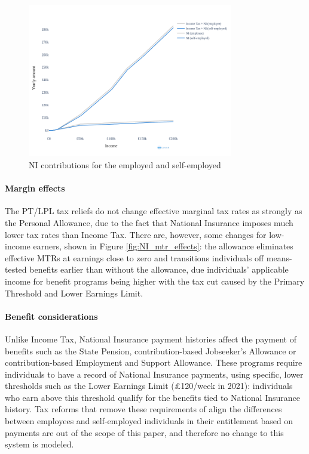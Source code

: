 \documentclass{article}
\begin{document}
    \begin{figure}
        \centering
        \includegraphics[width=0.8\textwidth]{images/fig_8.png}
        \caption{NI contributions for the employed and self-employed}
        \label{fig:NI_self_emp_diff}
    \end{figure}

    \paragraph{Margin effects} The PT/LPL tax reliefs do not change effective marginal tax rates as strongly as the Personal Allowance, due to the fact that National Insurance imposes much lower tax rates than Income Tax. There are, however, some changes for low-income earners, shown in Figure \ref{fig:NI_mtr_effects}: the allowance eliminates effective MTRs at earnings close to zero and transitions individuals off means-tested benefits earlier than without the allowance, due individuals' applicable income for benefit programs being higher with the tax cut caused by the Primary Threshold and Lower Earnings Limit.

    \paragraph{Benefit considerations} Unlike Income Tax, National Insurance payment histories affect the payment of benefits such as the State Pension, contribution-based Jobseeker's Allowance or contribution-based Employment and Support Allowance. These programs require individuals to have a record of National Insurance payments, using specific, lower thresholds such as the Lower Earnings Limit (£120/week in 2021): individuals who earn above this threshold qualify for the benefits tied to National Insurance history. Tax reforms that remove these requirements of align the differences between employees and self-employed individuals in their entitlement based on payments are out of the scope of this paper, and therefore no change to this system is modeled.
\end{document}
